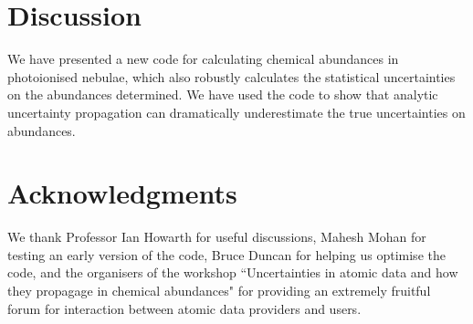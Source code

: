 \documentclass[useAMS,usenatbib]{mn2e}
\begin{document}
\section{Discussion}

We have presented a new code for calculating chemical abundances in photoionised nebulae, which also robustly calculates the statistical uncertainties on the abundances determined.  We have used the code to show that analytic uncertainty propagation can dramatically underestimate the true uncertainties on abundances.

\section*{Acknowledgments}

We thank Professor Ian Howarth for useful discussions, Mahesh Mohan for testing an early version of the code, Bruce Duncan for helping us optimise the code, and the organisers of the workshop ``Uncertainties in atomic data and how they propagage in chemical abundances" for providing an extremely fruitful forum for interaction between atomic data providers and users.





\label{lastpage}
\end{document}
